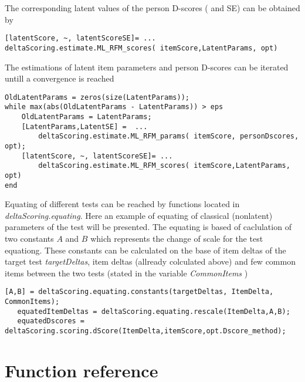 \documentclass[12pt]{article}
\begin{document}
The corresponding latent values of the person D-scores ( and SE) can be obtained by
\begin{lstlisting}[style=Matlab-bw]
[latentScore, ~, latentScoreSE]= ...
deltaScoring.estimate.ML_RFM_scores( itemScore,LatentParams, opt)
\end{lstlisting}

The estimations of latent item parameters and person D-scores can be iterated untill a convergence is reached

\begin{lstlisting}[style=Matlab-bw]
OldLatentParams = zeros(size(LatentParams));
while max(abs(OldLatentParams - LatentParams)) > eps
	OldLatentParams = LatentParams;
	[LatentParams,LatentSE] =  ...
		deltaScoring.estimate.ML_RFM_params( itemScore, personDscores, opt);
	[latentScore, ~, latentScoreSE]= ...
		deltaScoring.estimate.ML_RFM_scores( itemScore,LatentParams, opt)
end
\end{lstlisting}

Equating of different tests can be reached by functions located in {\itshape deltaScoring.equating}. Here an example of equating of classical (nonlatent) parameters of the test will be presented. The equating is based of caclulation of two constants $A$ and $B$ which represents the change of scale for the test equationg. These constants can be calculated on the base of  item deltas of the target test {\itshape  targetDeltas}, item deltas (allready colculated above) and few common items between the two tests (stated in the variable {\itshape CommonItems} )

\begin{lstlisting}[style=Matlab-bw]
   [A,B] = deltaScoring.equating.constants(targetDeltas, ItemDelta, CommonItems);
   equatedItemDeltas = deltaScoring.equating.rescale(ItemDelta,A,B);
   equatedDscores = deltaScoring.scoring.dScore(ItemDelta,itemScore,opt.Dscore_method);
\end{lstlisting}


\section{Function reference}


\end{document}
